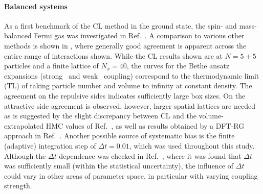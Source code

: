 \documentclass[../main.tex]{subfiles}
\begin{document}
\paragraph{Balanced systems}
%
As a first benchmark of the CL method in the ground state, the spin- and mass-balanced Fermi gas was investigated in Ref.~\cite{PRD96094506}. A comparison to various other methods is shown in , where generally good agreement is apparent across the entire range of interactions shown. While the CL results shown are at $N = 5+5$ particles and a finite lattice of $N_x = 40$, the curves for the Bethe ansatz expansions (strong~\cite{1742-5468-2007-06-P06011} and weak~\cite{doi:10.1063/1.4964252} coupling) correspond to the thermodynamic limit (TL) of taking particle number and volume to infinity at constant density.
The agreement on the repulsive sides indicates sufficiently large box sizes. On the attractive side agreement is observed, however, larger spatial lattices are needed as is suggested by the slight discrepancy between CL and the volume-extrapolated HMC values of Ref.~\cite{PhysRevA.96.033635}, as well as results obtained by a DFT-RG approach in Ref.~\cite{0954-3899-44-1-015101}. Another possible source of systematic bias is the finite (adaptive) integration step of $\Delta t = 0.01$, which was used throughout this study. Although the $\Delta t$ dependence was checked in Ref.~\cite{PRD96094506}, where it was found that $\Delta t$ was sufficiently small (within the statistical uncertainty), the influence of $\Delta t$ could vary in other areas of parameter space, in particular with varying coupling strength.
%
\end{document}
